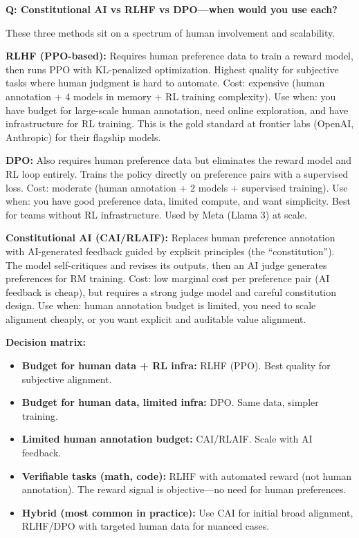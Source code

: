\begin{interviewq}
\textbf{Q: Constitutional AI vs RLHF vs DPO---when would you use each?}

 \quad {} \quad \badgefreq{\freqmed}

\stronganswer

These three methods sit on a spectrum of human involvement and scalability.

\textbf{RLHF (PPO-based):} Requires human preference data to train a reward model, then runs PPO with KL-penalized optimization. Highest quality for subjective tasks where human judgment is hard to automate. Cost: expensive (human annotation + 4 models in memory + RL training complexity). Use when: you have budget for large-scale human annotation, need online exploration, and have infrastructure for RL training. This is the gold standard at frontier labs (OpenAI, Anthropic) for their flagship models.

\textbf{DPO:} Also requires human preference data but eliminates the reward model and RL loop entirely. Trains the policy directly on preference pairs with a supervised loss. Cost: moderate (human annotation + 2 models + supervised training). Use when: you have good preference data, limited compute, and want simplicity. Best for teams without RL infrastructure. Used by Meta (Llama 3) at scale.

\textbf{Constitutional AI (CAI/RLAIF):} Replaces human preference annotation with AI-generated feedback guided by explicit principles (the ``constitution''). The model self-critiques and revises its outputs, then an AI judge generates preferences for RM training. Cost: low marginal cost per preference pair (AI feedback is cheap), but requires a strong judge model and careful constitution design. Use when: human annotation budget is limited, you need to scale alignment cheaply, or you want explicit and auditable value alignment.

\textbf{Decision matrix:}
\begin{itemize}
    \item \textbf{Budget for human data + RL infra:} RLHF (PPO). Best quality for subjective alignment.
    \item \textbf{Budget for human data, limited infra:} DPO. Same data, simpler training.
    \item \textbf{Limited human annotation budget:} CAI/RLAIF. Scale with AI feedback.
    \item \textbf{Verifiable tasks (math, code):} RLHF with automated reward (not human annotation). The reward signal is objective---no need for human preferences.
    \item \textbf{Hybrid (most common in practice):} Use CAI for initial broad alignment, RLHF/DPO with targeted human data for nuanced cases.
\end{itemize}


\end{interviewq}
